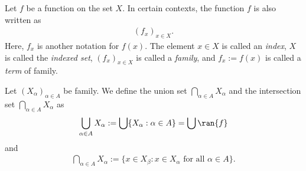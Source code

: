Let $f$ be a function on the set $X$. In certain contexts, the function $f$ is also written as
    \begin{align*}
        (f_x)_{x \in X}.
    \end{align*}
Here, $f_x$ is another notation for $f(x)$. The element $x \in X$ is called an \emph{index}, $X$ is called the \emph{indexed set}, $(f_x)_{x \in X}$ is called a \emph{family}, and $f_x := f(x)$ is called a \emph{term} of family.

\begin{definition}
    Let $(X_\alpha)_{\alpha \in A}$ be family. We define the union set $\bigcap_{\alpha \in A}X_\alpha$ and the intersection set $\bigcap_{\alpha \in A} X_\alpha$ as
    \begin{align*}
        \bigcup_{\alpha \in A}X_\alpha
        := \bigcup\{X_\alpha : \alpha \in A\}
        = \bigcup\ran{f}
    \end{align*}
    and
    \begin{align*}
        \bigcap_{\alpha \in A}X_\alpha
        := \{x \in X_\beta : x \in X_\alpha \text{ for all } \alpha \in A\}.
    \end{align*}
\end{definition}




















